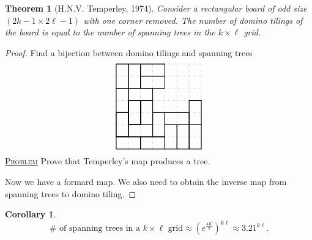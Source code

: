 \documentclass{report}
\newcommand{\fancyem}[1]{\underline{\textsc{#1}}}
\newtheorem{theorem}{Theorem}[section]
\newtheorem{corollary}{Corollary}[section]
\theoremstyle{definition}
\theoremstyle{remark}
\numberwithin{equation}{section}
\begin{document}
\begin{theorem}[H.N.V. Temperley, 1974]
    Consider a rectangular board of odd size $(2k - 1 \times 2\ell - 1)$ with one corner removed. The number of domino tilings of the board is equal to the number of spanning trees in the $k \times \ell$ grid.
\end{theorem}
\begin{proof}
    Find a bijection between domino tilings and spanning trees
    \[
    \begin{tikzpicture}
        \draw[step = 0.5cm, gray, very thin, dashed] (0, 0) grid (3.5, 3.5);
        \draw[black, thick] (0, 0) rectangle (1, 0.5);
        \draw[black, thick] (0, 0.5) rectangle (0.5, 1.5); 
        \draw[black, thick] (1, 0) rectangle (2, 0.5);
        \draw[black, thick] (2, 0) rectangle (2.5, 1);
        \draw[black, thick] (2.5, 0) rectangle (3, 1);
        \draw[black, thick] (3, 0) rectangle (3.5, 1);
        \draw[black, thick] (0.5, 0.5) rectangle (1.5, 1);
        \draw[black, thick] (1.5, 0.5) rectangle (2, 1.5);
        \draw[black, thick] (0, 0.5) rectangle (0.5, 1.5);
        \draw[black, thick] (2, 1) rectangle (3, 1.5);
        \draw[black, thick] (3, 1) rectangle (3.5, 2);
        \draw[black, thick] (0.5, 1) rectangle (1, 2);
        \draw[black, thick] (1, 1) rectangle (1.5, 2);
        \draw[black, thick] (0.5, 1) rectangle (1, 2);
        \draw[black, thick] (0, 1.5) rectangle (0.5, 2.5);
        \draw[black, thick] (0, 2.5) rectangle (0.5, 3.5);
        \draw[black, thick] (0.5, 2) rectangle (1.5, 2.5);
        \draw[black, thick] (0.5, 2.5) rectangle (1, 3.5);
        \draw[black, thick] (1, 2.5) rectangle (2, 3);
        \draw[black, thick] (1, 3) rectangle (2, 3.5);
        \draw[black, thick] (0.5, 1) rectangle (1, 2);
        \draw[black, thick] (0.5, 1) rectangle (1, 2);
        \draw[black, thick] (0.5, 1) rectangle (1, 2);
        \draw[black, thick] (0.5, 1) rectangle (1, 2);
    \end{tikzpicture}
    \]
\fancyem{Problem} Prove that Temperley's map produces a tree.

Now we have a formard map. We also need to obtain the inverse map from spanning trees to domino tiling.
\end{proof}

\begin{corollary}
    \[
        \# \text{ of spanning trees in a $k \times \ell$ grid} \approx \left(e^\frac{4K}{\pi}\right)^{k\ell} \approx 3.21^{k\ell}.
    \]
\end{corollary}
\end{document}
